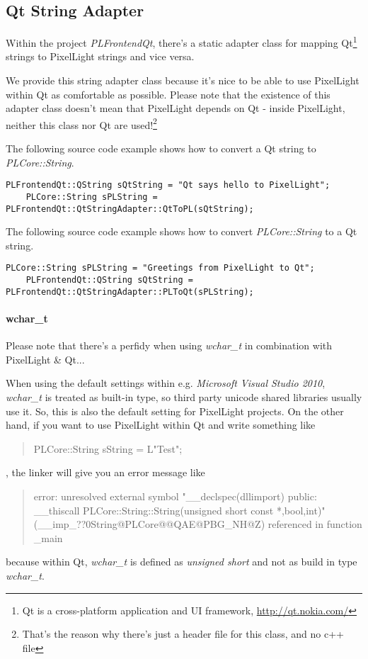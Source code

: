 \subsection{Qt String Adapter}
Within the project \emph{PLFrontendQt}, there's a static adapter class for mapping Qt\footnote{Qt is a cross-platform application and UI framework, \url{http://qt.nokia.com/}} strings to PixelLight strings and vice versa.

We provide this string adapter class because it's nice to be able to use PixelLight within Qt as comfortable as possible. Please note that the existence of this adapter class doesn't mean that PixelLight depends on Qt - inside PixelLight, neither this class nor Qt are used!\footnote{That's the reason why there's just a header file for this class, and no c++ file}

The following source code example shows how to convert a Qt string to \emph{PLCore::String}.
\begin{lstlisting}[caption=Qt string to PLCore::String]
	PLFrontendQt::QString sQtString = "Qt says hello to PixelLight";
	PLCore::String sPLString = PLFrontendQt::QtStringAdapter::QtToPL(sQtString);
\end{lstlisting}

The following source code example shows how to convert \emph{PLCore::String} to a Qt string.
\begin{lstlisting}[caption=PLCore::String string to Qt]
	PLCore::String sPLString = "Greetings from PixelLight to Qt";
	PLFrontendQt::QString sQtString = PLFrontendQt::QtStringAdapter::PLToQt(sPLString);
\end{lstlisting}


\paragraph{wchar\_t}
Please note that there's a perfidy when using \emph{wchar\_t} in combination with PixelLight \& Qt...

When using the default settings within e.g. \emph{Microsoft Visual Studio 2010}, \emph{wchar\_t} is treated as built-in type, so third party unicode shared libraries usually use it. So, this is also the default setting for PixelLight projects. On the other hand, if you want to use PixelLight within Qt and write something like \begin{quote}PLCore::String sString = L"Test";\end{quote}, the linker will give you an error message like \begin{quote}error:  unresolved external symbol "\_\_declspec(dllimport) public: \_\_thiscall PLCore::String::String(unsigned short const *,bool,int)" (\_\_imp\_??0String@PLCore@@QAE@PBG\_NH@Z) referenced in function \_main\end{quote} because within Qt, \emph{wchar\_t} is defined as \emph{unsigned short} and not as build in type \emph{wchar\_t}.

